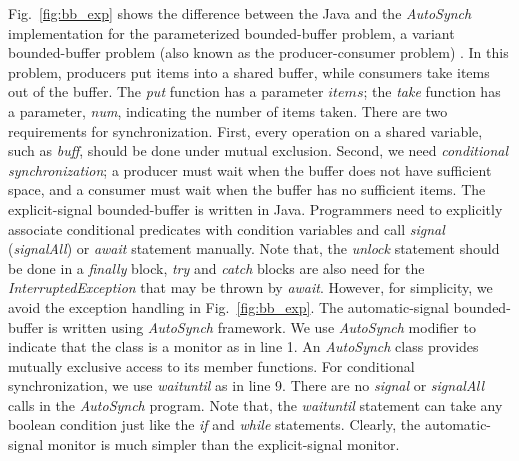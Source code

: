 \documentclass{sigplanconf}
\begin{document}

Fig.~\ref{fig:bb_exp} shows the difference between 
the Java and the {\em AutoSynch} implementation for the parameterized bounded-buffer
problem, a variant bounded-buffer problem (also known as the producer-consumer 
problem) \cite{dijk65, dijk71}. 
In this problem, producers put items into a shared buffer, while 
consumers take items out of the buffer. The {\em put} function has a parameter
$items$; the {\em take} function has a parameter, {\em num}, 
indicating the number of items taken. There are two requirements for synchronization.
First, every operation on a shared variable, such as {\em buff}, should be done 
under mutual exclusion. Second, we need {\em conditional synchronization};
a producer must wait when the buffer does not have sufficient space, and a consumer 
must wait when the buffer has no sufficient items. The explicit-signal 
bounded-buffer is written in Java. 
Programmers need to explicitly associate conditional 
predicates with condition variables and call {\em signal} ({\em signalAll}) or
{\em await} statement manually. Note that, the {\em unlock} statement should be 
done in a {\em finally} block, {\em try} and {\em catch} blocks are also need for the 
{\em InterruptedException} that may be thrown by {\em await}. However, for
simplicity, we avoid the exception handling in Fig.~\ref{fig:bb_exp}. 
The automatic-signal bounded-buffer is written using {\em AutoSynch} framework.
We use {\em AutoSynch} modifier to indicate that the class is a monitor as in line 
1. An {\em AutoSynch} class provides mutually exclusive access to its member
functions. For 
conditional synchronization,  we use {\em waituntil} as in line 9. There are 
no {\em signal} or {\em signalAll} calls in the {\em AutoSynch} program. Note
that, the {\em waituntil} statement can take any boolean condition just like 
the {\em if} and {\em while} statements. 
Clearly, the automatic-signal monitor is
much simpler than the explicit-signal monitor. 
\end{document}
